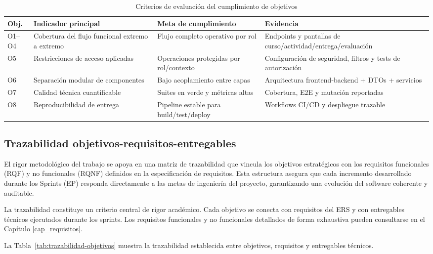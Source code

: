 \begin{table}[!htbp]
\centering
\begin{tabular}{|P{2cm}|P{3.4cm}|P{3.3cm}|P{3.7cm}|}
\hline
\textbf{Obj.} & \textbf{Indicador principal} & \textbf{Meta de cumplimiento} & \textbf{Evidencia} \\
\hline
O1--O4 & Cobertura del flujo funcional extremo a extremo & Flujo completo operativo por rol & Endpoints y pantallas de curso/actividad/entrega/evaluaci\'on \\
\hline
O5 & Restricciones de acceso aplicadas & Operaciones protegidas por rol/contexto & Configuraci\'on de seguridad, filtros y tests de autorizaci\'on \\
\hline
O6 & Separaci\'on modular de componentes & Bajo acoplamiento entre capas & Arquitectura frontend-backend + DTOs + servicios \\
\hline
O7 & Calidad t\'ecnica cuantificable & Suites en verde y m\'etricas altas & Cobertura, E2E y mutaci\'on reportadas \\
\hline
O8 & Reproducibilidad de entrega & Pipeline estable para build/test/deploy & Workflows CI/CD y despliegue trazable \\
\hline
\end{tabular}
\caption{Criterios de evaluaci\'on del cumplimiento de objetivos}
\label{tab:criterios-cumplimiento-objetivos}
\end{table}

\subsection{Trazabilidad objetivos-requisitos-entregables}

El rigor metodol\'ogico del trabajo se apoya en una matriz de trazabilidad que vincula los objetivos estrat\'egicos con los requisitos funcionales (RQF) y no funcionales (RQNF) definidos en la especificaci\'on de requisitos. Esta estructura asegura que cada incremento desarrollado durante los Sprints (EP) responda directamente a las metas de ingenier\'ia del proyecto, garantizando una evoluci\'on del software coherente y auditable.

La trazabilidad constituye un criterio central de rigor acad\'emico.
Cada objetivo se conecta con requisitos del ERS y con entregables t\'ecnicos ejecutados durante los sprints. Los requisitos funcionales y no funcionales detallados de forma exhaustiva pueden consultarse en el Cap\'itulo \ref{cap_requisitos}.

La Tabla~\ref{tab:trazabilidad-objetivos} muestra la trazabilidad establecida entre objetivos, requisitos y entregables t\'ecnicos.

